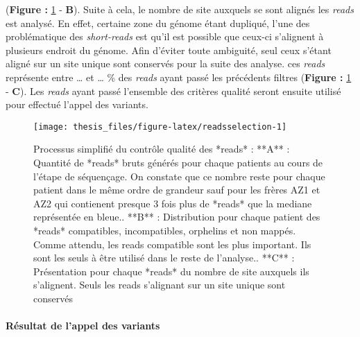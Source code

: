 \documentclass[12pt,twoside]{reedthesis}
\theoremstyle{definition}
\theoremstyle{definition}
\theoremstyle{remark}
\begin{document}
  (\textbf{Figure : }\ref{fig:readsselection} - \textbf{B}). Suite à cela,
  le nombre de site auxquels se sont alignés les \emph{reads} est analysé.
  En effet, certaine zone du génome étant dupliqué, l'une des
  problématique des \emph{short-reads} est qu'il est possible que ceux-ci
  s'alignent à plusieurs endroit du génome. Afin d'éviter toute ambiguité,
  seul ceux s'étant aligné sur un site unique sont conservés pour la suite
  des analyse. ces \emph{reads} représente entre \ldots{} et \ldots{} \%
  des \emph{reads} ayant passé les précédents filtres (\textbf{Figure :
  }\ref{fig:readsselection} - \textbf{C}). Les \emph{reads} ayant passé
  l'ensemble des critères qualité seront ensuite utilisé pour effectué
  l'appel des variants.
  
  \newpage
  
  \begin{figure}
  
  {\centering \texttt{[image: thesis\_files/figure-latex/readsselection-1]} 
  
  }
  
  \caption[Processus simplifié du contrôle qualité des *reads*]{Processus simplifié du contrôle qualité des *reads* : **A** : Quantité de *reads* bruts générés pour chaque patients au cours de l'étape de séquençage. On constate que ce nombre reste pour chaque patient dans le même ordre de grandeur sauf pour les frères AZ1 et AZ2  qui contienent presque 3 fois plus de *reads* que la mediane représentée en bleue.. **B** : Distribution pour chaque patient des *reads* compatibles, incompatibles, orphelins et non mappés. Comme attendu, les reads compatible sont les plus important. Ils sont les seuls à être utilisé dans le reste de l'analyse.. **C** : Présentation pour chaque *reads* du nombre de site auxquels ils s'alignent. Seuls les reads s'alignant sur un site unique sont conservés}\label{fig:readsselection}
  \end{figure}
  
  \newpage
  
  \paragraph{Résultat de l'appel des
  variants}\label{resultat-de-lappel-des-variants}
  
\end{document}
